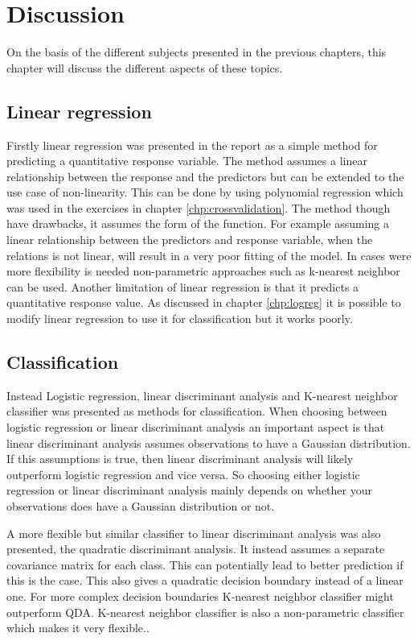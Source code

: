 \chapter{Discussion}
\label{chp:disc}
On the basis of the different subjects presented in the previous chapters, this chapter will discuss the different aspects of these  topics.

\section{Linear regression}

Firstly linear regression was presented in the report as a simple method for predicting a quantitative response variable. The method assumes a linear relationship between the response and the predictors but can be extended to the use case of non-linearity. This can be done by using polynomial regression which was used in the exercises in chapter \ref{chp:crossvalidation}. The method though have drawbacks, it assumes the form of the function. For example assuming a linear relationship between the predictors and response variable, when the relations is not linear, will result in a very poor fitting of the model. In cases were more flexibility is needed non-parametric approaches such as k-nearest neighbor can be used. Another limitation of linear regression is that it predicts a quantitative response value. As discussed in chapter \ref{chp:logreg} it is possible to modify linear regression to use it for classification but it works poorly.

\section{Classification}

Instead Logistic regression, linear discriminant analysis and K-nearest neighbor classifier was presented as methods for classification. When choosing between logistic regression or linear discriminant analysis an important aspect is that linear discriminant analysis assumes observations to have a Gaussian distribution. If this assumptions is true, then linear discriminant analysis will likely outperform logistic regression and vice versa. So choosing either logistic regression or linear discriminant analysis mainly depends on whether your observations does have a Gaussian distribution or not. 
 
A more flexible but similar classifier to linear discriminant analysis was also presented, the quadratic discriminant analysis. It instead assumes a separate covariance matrix for each class. This can potentially lead to better prediction if this is the case. This also gives a quadratic decision boundary instead of a linear one. For more complex decision boundaries K-nearest neighbor classifier might outperform QDA. K-nearest neighbor classifier is also a non-parametric classifier which makes it very flexible..

